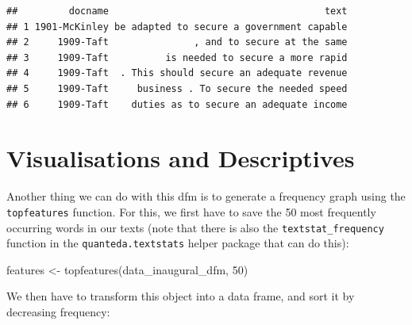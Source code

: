 \documentclass[
]{book}
\newenvironment{Shaded}{\begin{snugshade}}{\end{snugshade}}
\newcommand{\AttributeTok}[1]{\textcolor[rgb]{0.77,0.63,0.00}{#1}}
\newcommand{\DecValTok}[1]{\textcolor[rgb]{0.00,0.00,0.81}{#1}}
\newcommand{\FunctionTok}[1]{\textcolor[rgb]{0.00,0.00,0.00}{#1}}
\newcommand{\NormalTok}[1]{#1}
\newcommand{\OtherTok}[1]{\textcolor[rgb]{0.56,0.35,0.01}{#1}}
\newcommand{\SpecialCharTok}[1]{\textcolor[rgb]{0.00,0.00,0.00}{#1}}
\newcommand{\StringTok}[1]{\textcolor[rgb]{0.31,0.60,0.02}{#1}}
\begin{document}
\begin{Shaded}
\end{Shaded}

\begin{verbatim}
##         docname                                      text
## 1 1901-McKinley be adapted to secure a government capable
## 2     1909-Taft               , and to secure at the same
## 3     1909-Taft          is needed to secure a more rapid
## 4     1909-Taft  . This should secure an adequate revenue
## 5     1909-Taft     business . To secure the needed speed
## 6     1909-Taft    duties as to secure an adequate income
\end{verbatim}

\hypertarget{visualisations-and-descriptives}{%
\section{Visualisations and Descriptives}\label{visualisations-and-descriptives}}

Another thing we can do with this dfm is to generate a frequency graph using the \texttt{topfeatures} function. For this, we first have to save the 50 most frequently occurring words in our texts (note that there is also the \texttt{textstat\_frequency} function in the \texttt{quanteda.textstats} helper package that can do this):

\begin{Shaded}
\begin{Highlighting}[]
\NormalTok{features }\OtherTok{\textless{}{-}} \FunctionTok{topfeatures}\NormalTok{(data\_inaugural\_dfm, }\DecValTok{50}\NormalTok{)}
\end{Highlighting}
\end{Shaded}

We then have to transform this object into a data frame, and sort it by decreasing frequency:

\begin{Shaded}
\end{Shaded}
\end{document}

